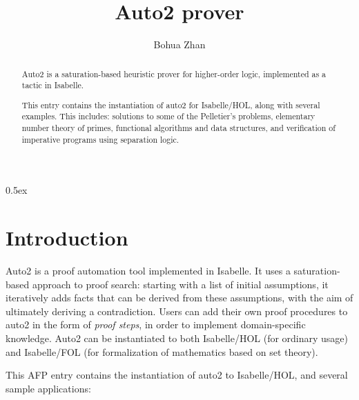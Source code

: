 \documentclass[11pt,a4paper]{article}
\begin{document}
\title{Auto2 prover}
\author{Bohua Zhan}
\maketitle

\begin{abstract}
  Auto2 is a saturation-based heuristic prover for higher-order logic,
  implemented as a tactic in Isabelle.

  This entry contains the instantiation of auto2 for Isabelle/HOL,
  along with several examples. This includes: solutions to some of the
  Pelletier's problems, elementary number theory of primes, functional
  algorithms and data structures, and verification of imperative
  programs using separation logic.
\end{abstract}

\newpage
\tableofcontents
\newpage
\parindent 0pt\parskip 0.5ex

\section{Introduction}

Auto2 \cite{zhan16} is a proof automation tool implemented in
Isabelle. It uses a saturation-based approach to proof search:
starting with a list of initial assumptions, it iteratively adds facts
that can be derived from these assumptions, with the aim of ultimately
deriving a contradiction. Users can add their own proof procedures to
auto2 in the form of \emph{proof steps}, in order to implement
domain-specific knowledge. Auto2 can be instantiated to both
Isabelle/HOL (for ordinary usage) and Isabelle/FOL (for formalization
of mathematics based on set theory).

This AFP entry contains the instantiation of auto2 to Isabelle/HOL,
and several sample applications:
\end{document}
